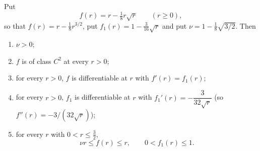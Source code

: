 \begin{lemma}[The concave radial profile $f(r)=r-\tfrac18r^{3/2}$]
Put
\[
  f(r)=r-\tfrac18 r\sqrt r\qquad(r\ge0),
\]
so that $f(r)=r-\tfrac18r^{3/2}$, put $f_1(r)=1-\tfrac3{16}\sqrt r$ and put
$\nu=1-\tfrac18\sqrt{3/2}$. Then
\begin{enumerate}
\item $\nu>0$;
\item $f$ is of class $C^2$ at every $r>0$;
\item for every $r>0$, $f$ is differentiable at $r$ with $f'(r)=f_1(r)$;
\item for every $r>0$, $f_1$ is differentiable at $r$ with
  $f_1'(r)=-\dfrac3{32\sqrt r}$ (so $f''(r)=-3/(32\sqrt r)$);
\item for every $r$ with $0<r\le\tfrac32$,
  \[
    \nu r\le f(r)\le r,\qquad 0<f_1(r)\le1 .
  \]
\end{enumerate}
\end{lemma}
